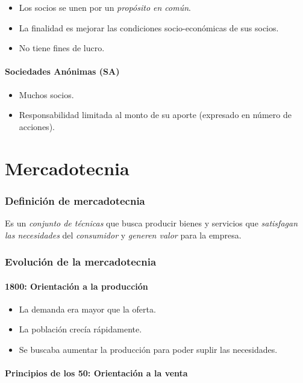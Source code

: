 \documentclass[12pt, spanish, a5paper]{article}
\begin{document}
\begin{itemize}
	\item Los socios se unen por un \emph{propósito en común}.
	\item La finalidad es mejorar las condiciones socio-económicas de sus socios.
	\item No tiene fines de lucro.
\end{itemize}


\subsection{Sociedades Anónimas (SA)}
\begin{itemize}
	\item Muchos socios.
	\item Responsabilidad limitada al monto de su aporte (expresado en número de acciones).
\end{itemize}



\part{Mercadotecnia}

\section{Definición de mercadotecnia}
Es un \emph{conjunto de técnicas} que busca producir bienes y servicios que \emph{satisfagan las necesidades} del \emph{consumidor} y \emph{generen valor} para la empresa.

\section{Evolución de la mercadotecnia}

\subsection{1800: Orientación a la producción}

\begin{itemize}
	\item La demanda era mayor que la oferta.
	\item La población crecía rápidamente.
	\item Se buscaba aumentar la producción para poder suplir las necesidades.
\end{itemize}

\subsection{Principios de los 50: Orientación a la venta}
\end{document}
